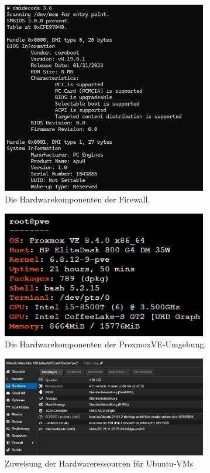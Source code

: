 \documentclass[12pt]{scrreprt}
\begin{document}
\begin{thebibliography}{99}
\begin{figure}[htbp]
	\centering
	\includegraphics[width=0.8\textwidth]{opnsense-hardware.png}
	\caption{Die Hardwarekomponenten der Firewall.}
	\label{fig:hardware-apu4} %
\end{figure}

\begin{figure}[htbp]
	\centering
	\includegraphics[width=0.8\textwidth]{proxmox-hardware.png}
	\caption{Die Hardwarekomponenten der ProxmoxVE-Umgebung.}
	\label{fig:hardware-prox} %
\end{figure}

\begin{figure}[htbp]
	\centering
	\includegraphics[width=0.8\textwidth]{ubuntu01-hardware.png}
	\caption{Zuweisung der Hardwareressourcen für Ubuntu-VMs}
	\label{fig:ubuntu-hardware} %
\end{figure}


\end{thebibliography}
\end{document}
